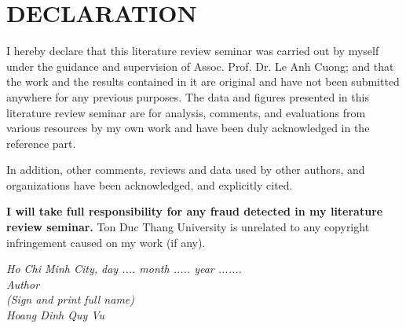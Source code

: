 \chapter*{DECLARATION}
I hereby declare that this literature review seminar was carried out by myself under the guidance and supervision of Assoc. Prof. Dr. Le Anh Cuong; and that the work and the results contained in it are original and have not been submitted anywhere for any previous purposes. The data and figures presented in this literature review seminar are for analysis, comments, and evaluations from various resources by my own work and have been duly acknowledged in the reference part.

In addition, other comments, reviews and data used by other authors, and organizations have been acknowledged, and explicitly cited.

\textbf{I will take full responsibility for any fraud detected in my literature review seminar.} Ton Duc Thang University is unrelated to any copyright infringement caused on my work (if any).

\vspace*{1cm}
\begin{flushright}
	\begin{minipage}{8.75cm}
		\centering\itshape
		Ho Chi Minh City, day .... month .....  year .......\\
		Author\\[3cm]
		(Sign and print full name)\\
		Hoang Dinh Quy Vu
	\end{minipage}
\end{flushright}
\newpage